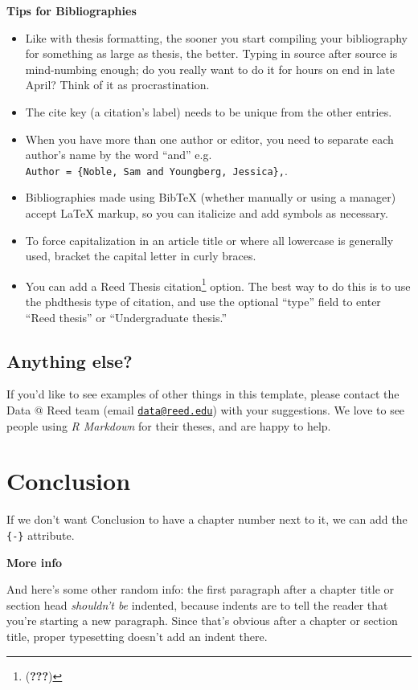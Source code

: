 \documentclass[12pt,twoside]{reedthesis}
\providecommand{\tightlist}{%
  \setlength{\itemsep}{0pt}\setlength{\parskip}{0pt}}
\begin{document}
\textbf{Tips for Bibliographies}
\begin{itemize}
\tightlist
\item
  Like with thesis formatting, the sooner you start compiling your bibliography for something as large as thesis, the better. Typing in source after source is mind-numbing enough; do you really want to do it for hours on end in late April? Think of it as procrastination.
\item
  The cite key (a citation's label) needs to be unique from the other entries.
\item
  When you have more than one author or editor, you need to separate each author's name by the word ``and'' e.g. \texttt{Author\ =\ \{Noble,\ Sam\ and\ Youngberg,\ Jessica\},}.
\item
  Bibliographies made using BibTeX (whether manually or using a manager) accept LaTeX markup, so you can italicize and add symbols as necessary.
\item
  To force capitalization in an article title or where all lowercase is generally used, bracket the capital letter in curly braces.
\item
  You can add a Reed Thesis citation\footnote{({\textbf{???}})} option. The best way to do this is to use the phdthesis type of citation, and use the optional ``type'' field to enter ``Reed thesis'' or ``Undergraduate thesis.''
\end{itemize}
\hypertarget{anything-else}{%
\section{Anything else?}\label{anything-else}}

If you'd like to see examples of other things in this template, please contact the Data @ Reed team (email \href{mailto:data@reed.edu}{\nolinkurl{data@reed.edu}}) with your suggestions. We love to see people using \emph{R Markdown} for their theses, and are happy to help.

\hypertarget{conclusion}{%
\chapter*{Conclusion}\label{conclusion}}

If we don't want Conclusion to have a chapter number next to it, we can add the \texttt{\{-\}} attribute.

\textbf{More info}

And here's some other random info: the first paragraph after a chapter title or section head \emph{shouldn't be} indented, because indents are to tell the reader that you're starting a new paragraph. Since that's obvious after a chapter or section title, proper typesetting doesn't add an indent there.
\end{document}
